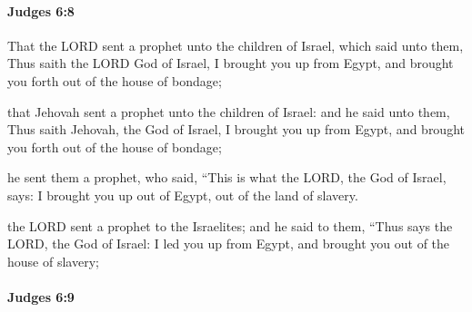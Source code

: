 		\paragraph{Judges 6:8} %
			\label{JUDGES-6-8}

			That the LORD sent a prophet unto the children of Israel, which said unto them, Thus saith the LORD God of Israel, I brought you up from Egypt, and brought you forth out of the house of bondage;

			\begin{versebox}
					\item[BHS] 
					\item[ASV] that Jehovah sent a prophet unto the children of Israel: and he said unto them, Thus saith Jehovah, the God of Israel, I brought you up from Egypt, and brought you forth out of the house of bondage;
					\item[NIV] he sent them a prophet, who said, “This is what the LORD, the God of Israel, says: I brought you up out of Egypt, out of the land of slavery.
					\item[NRSV] the LORD sent a prophet to the Israelites; and he said to them, “Thus says the LORD, the God of Israel: I led you up from Egypt, and brought you out of the house of slavery;
			\end{versebox}

		\paragraph{Judges 6:9} %
			\label{JUDGES-6-9}

